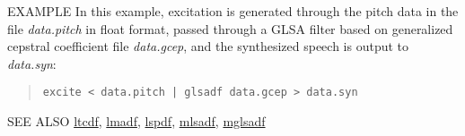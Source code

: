 \newpage
\begin{options}
\end{options}

\begin{qsection}{EXAMPLE}
In this example, excitation is generated through the pitch data
in the file {\em data.pitch} in float format, passed through a
GLSA filter based on generalized cepstral coefficient file
{\em data.gcep}, and the synthesized speech is output to
{\em data.syn}:
\begin{quote}
 \verb!excite < data.pitch | glsadf data.gcep > data.syn!
\end{quote} 
\end{qsection}

\begin{qsection}{SEE ALSO}
\hyperlink{ltcdf}{ltcdf},
\hyperlink{lmadf}{lmadf},
\hyperlink{lspdf}{lspdf},
\hyperlink{mlsadf}{mlsadf},
\hyperlink{mglsadf}{mglsadf}
\end{qsection}
